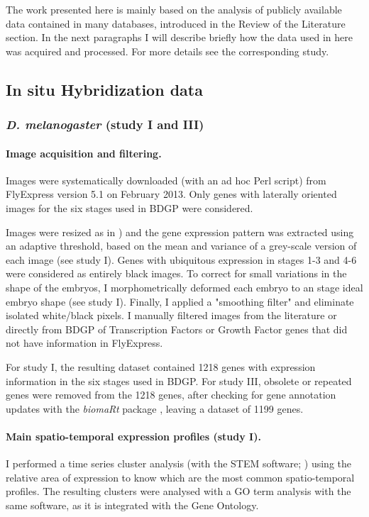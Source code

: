 The work presented here is mainly based on the analysis of publicly available data contained in many databases, introduced in the Review of the Literature section. In the next paragraphs I will describe briefly how the data used in here was acquired and processed. For more details see the corresponding study.

\subsection{In situ Hybridization data}

\subsubsection{\textit{D. melanogaster} (study I and III)}
\label{insitu_drosophila}
\paragraph{Image acquisition and filtering.}

Images were systematically downloaded (with an ad hoc Perl script) from FlyExpress version 5.1 \citep{Kumar2011} on February 2013. Only genes with laterally oriented images for the six stages used in BDGP \citep{Tomancak2002} were considered.

Images were resized as in \citet{Konikoff2012}) and the gene expression pattern was extracted using an adaptive threshold, based on the mean and variance of a grey-scale version of each image (see study I). Genes with ubiquitous expression in stages 1-3 and 4-6 were considered as entirely black images.
To correct for small variations in the shape of the embryos, I morphometrically deformed each embryo to an stage ideal embryo shape (see study I). Finally, I applied a "smoothing filter" and eliminate isolated white/black pixels. 
I manually filtered images from the literature or directly from BDGP of Transcription Factors or Growth Factor genes that did not have information in FlyExpress.
 
For study I, the resulting dataset contained 1218 genes with expression information in the six stages used in BDGP. For study III, obsolete or repeated genes were removed from the 1218 genes, after checking for gene annotation updates with the \textit{biomaRt} package \citep{Durinck2009}, leaving a dataset of 1199 genes.

\paragraph{Main spatio-temporal expression profiles (study I).}
I performed a time series cluster analysis (with the STEM software; \citealp{Ernst2006}) using the relative area of expression to know which are the most common spatio-temporal profiles. The resulting clusters were analysed with a GO term analysis with the same software, as it is integrated with the Gene Ontology.

